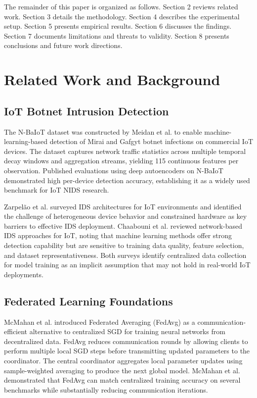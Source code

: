 \documentclass[11pt,a4paper]{article}
\begin{document}
The remainder of this paper is organized as follows. Section 2 reviews related work. Section 3 details the methodology. Section 4 describes the experimental setup. Section 5 presents empirical results. Section 6 discusses the findings. Section 7 documents limitations and threats to validity. Section 8 presents conclusions and future work directions.

\section{Related Work and Background}

\subsection{IoT Botnet Intrusion Detection}
The N-BaIoT dataset \cite{ref2} was constructed by Meidan et al. to enable machine-learning-based detection of Mirai and Gafgyt botnet infections on commercial IoT devices. The dataset captures network traffic statistics across multiple temporal decay windows and aggregation streams, yielding 115 continuous features per observation. Published evaluations using deep autoencoders on N-BaIoT demonstrated high per-device detection accuracy, establishing it as a widely used benchmark for IoT NIDS research.

Zarpelão et al. \cite{ref3} surveyed IDS architectures for IoT environments and identified the challenge of heterogeneous device behavior and constrained hardware as key barriers to effective IDS deployment. Chaabouni et al. \cite{ref4} reviewed network-based IDS approaches for IoT, noting that machine learning methods offer strong detection capability but are sensitive to training data quality, feature selection, and dataset representativeness. Both surveys identify centralized data collection for model training as an implicit assumption that may not hold in real-world IoT deployments.

\subsection{Federated Learning Foundations}
McMahan et al. \cite{ref1} introduced Federated Averaging (FedAvg) as a communication-efficient alternative to centralized SGD for training neural networks from decentralized data. FedAvg reduces communication rounds by allowing clients to perform multiple local SGD steps before transmitting updated parameters to the coordinator. The central coordinator aggregates local parameter updates using sample-weighted averaging to produce the next global model. McMahan et al. demonstrated that FedAvg can match centralized training accuracy on several benchmarks while substantially reducing communication iterations.
\end{document}
